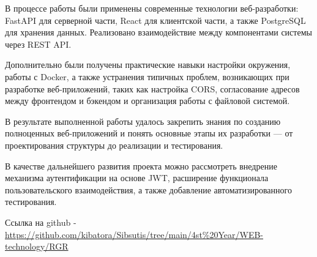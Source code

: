 В процессе работы были применены современные технологии веб-разработки: FastAPI для серверной части, React для клиентской части, а также PostgreSQL для хранения данных. Реализовано взаимодействие между компонентами системы через REST API.

Дополнительно были получены практические навыки настройки окружения, работы с Docker, а также устранения типичных проблем, возникающих при разработке веб-приложений, таких как настройка CORS, согласование адресов между фронтендом и бэкендом и организация работы с файловой системой.

В результате выполненной работы удалось закрепить знания по созданию полноценных веб-приложений и понять основные этапы их разработки — от проектирования структуры до реализации и тестирования.

В качестве дальнейшего развития проекта можно рассмотреть внедрение механизма аутентификации на основе JWT, расширение функционала пользовательского взаимодействия, а также добавление автоматизированного тестирования.

Ссылка на github - \url{https://github.com/kibatora/Sibsutis/tree/main/4st%20Year/WEB-technology/RGR}